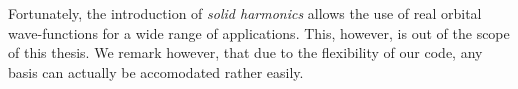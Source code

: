 Fortunately, the introduction of \emph{solid harmonics} allows the use
of real orbital wave-functions for a wide range of applications. This, however, is out of the scope of this thesis.
We remark however, that due to the flexibility of our code, any basis can actually be accomodated rather easily.
